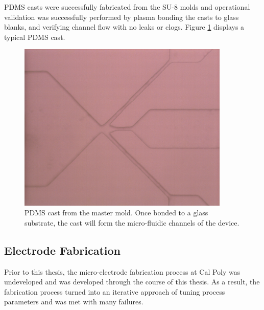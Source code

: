 \par PDMS casts were successfully fabricated from the SU-8 molds and operational validation was successfully performed by plasma bonding the casts to glass blanks, and verifying channel flow with no leaks or clogs. Figure \ref{fig:pdms_results} displays a typical PDMS cast.

\begin{figure}[H]
    \centering
    \includegraphics[width=0.9\textwidth]{images/PDMS_channels.png}
    \caption{PDMS cast from the master mold. Once bonded to a glass substrate, the cast will form the micro-fluidic channels of the device.}
    \label{fig:pdms_results}
\end{figure}

\FloatBarrier


\subsection{Electrode Fabrication}

\par Prior to this thesis, the micro-electrode fabrication process at Cal Poly was undeveloped and was developed through the course of this thesis. As a result, the fabrication process turned into an iterative approach of tuning process parameters and was met with many failures.

